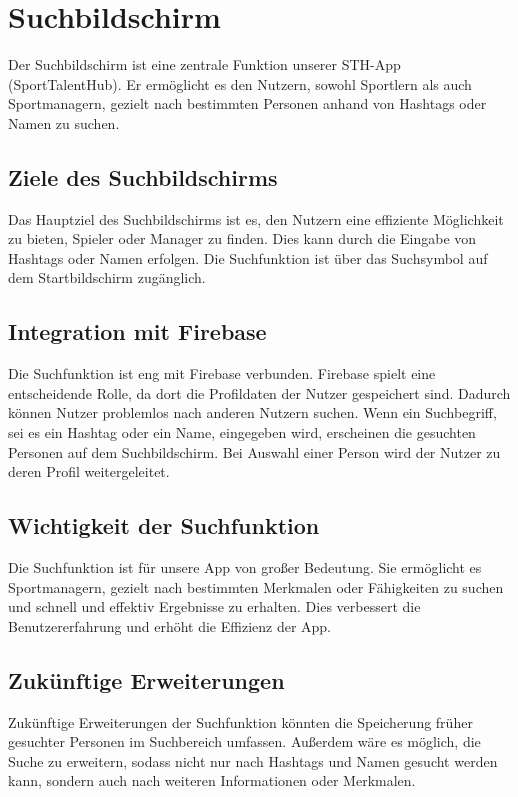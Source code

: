 \chapter{Suchbildschirm}

Der Suchbildschirm ist eine zentrale Funktion unserer STH-App (SportTalentHub). Er ermöglicht es den Nutzern, sowohl Sportlern als auch Sportmanagern, gezielt nach bestimmten Personen anhand von Hashtags oder Namen zu suchen.

\section{Ziele des Suchbildschirms}

Das Hauptziel des Suchbildschirms ist es, den Nutzern eine effiziente Möglichkeit zu bieten, Spieler oder Manager zu finden. Dies kann durch die Eingabe von Hashtags oder Namen erfolgen. Die Suchfunktion ist über das Suchsymbol auf dem Startbildschirm zugänglich.

\section{Integration mit Firebase}

Die Suchfunktion ist eng mit Firebase verbunden. Firebase spielt eine entscheidende Rolle, da dort die Profildaten der Nutzer gespeichert sind. Dadurch können Nutzer problemlos nach anderen Nutzern suchen. Wenn ein Suchbegriff, sei es ein Hashtag oder ein Name, eingegeben wird, erscheinen die gesuchten Personen auf dem Suchbildschirm. Bei Auswahl einer Person wird der Nutzer zu deren Profil weitergeleitet.

\section{Wichtigkeit der Suchfunktion}

Die Suchfunktion ist für unsere App von großer Bedeutung. Sie ermöglicht es Sportmanagern, gezielt nach bestimmten Merkmalen oder Fähigkeiten zu suchen und schnell und effektiv Ergebnisse zu erhalten. Dies verbessert die Benutzererfahrung und erhöht die Effizienz der App.

\section{Zukünftige Erweiterungen}

Zukünftige Erweiterungen der Suchfunktion könnten die Speicherung früher gesuchter Personen im Suchbereich umfassen. Außerdem wäre es möglich, die Suche zu erweitern, sodass nicht nur nach Hashtags und Namen gesucht werden kann, sondern auch nach weiteren Informationen oder Merkmalen.



